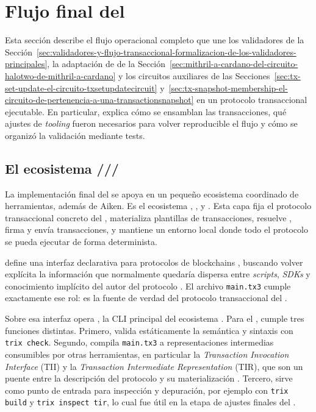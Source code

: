 
\section{Flujo final del \zkBridge}
\label{sec:final-bridge-flow-flujo-final-del-zkbridge}

Esta sección describe el flujo operacional completo que une los validadores de la Sección~\ref{sec:validadores-y-flujo-transaccional-formalizacion-de-los-validadores-principales}, la adaptación de \HaloTwo de la Sección~\ref{sec:mithril-a-cardano-del-circuito-halotwo-de-mithril-a-cardano} y los circuitos auxiliares de las Secciones~\ref{sec:tx-set-update-el-circuito-txsetupdatecircuit} y~\ref{sec:tx-snapshot-membership-el-circuito-de-pertenencia-a-una-transactionsnapshot} en un protocolo transaccional ejecutable. En particular, explica cómo se ensamblan las transacciones, qué ajustes de \textit{tooling} fueron necesarios para volver reproducible el flujo y cómo se organizó la validación mediante tests.

\subsection{El ecosistema \texorpdfstring{\TxThree/\Trix/\CShell/\Dolos}{Tx3/Trix/cshell/dolos}}
\label{subsec:final-bridge-flow-el-ecosistema-tx3-trix-cshell-dolos}

La implementación final del \zkBridge se apoya en un pequeño ecosistema coordinado de herramientas, además de Aiken. Es el ecosistema \TxThree, \Trix, \CShell y \Dolos. Esta capa fija el protocolo transaccional concreto del \zkBridge, materializa plantillas de transacciones, resuelve \UTxOs, firma y envía transacciones, y mantiene un entorno local donde todo el protocolo se pueda ejecutar de forma determinista.

\TxThree define una interfaz declarativa para protocolos de blockchains \UTxO, buscando volver explícita la información \Offchain que normalmente quedaría dispersa entre \textit{scripts}, \textit{SDKs} y conocimiento implícito del autor del protocolo \cite{Tx3DocsIntroduction}. El archivo \texttt{main.tx3} cumple exactamente ese rol: es la fuente de verdad del protocolo transaccional del \zkBridge.

Sobre esa interfaz opera \Trix, la CLI principal del ecosistema \TxThree \cite{Tx3DocsTrix}. Para el \zkBridge, \Trix cumple tres funciones distintas. Primero, valida estáticamente la semántica y sintaxis con \texttt{trix check}. Segundo, compila \texttt{main.tx3} a representaciones intermedias consumibles por otras herramientas, en particular la \textit{Transaction Invocation Interface} (TII) y la \textit{Transaction Intermediate Representation} (TIR), que son un puente entre la descripción del protocolo y su materialización \cite{Tx3DocsIntroduction,Tx3DocsTrix}. Tercero, sirve como punto de entrada para inspección y depuración, por ejemplo con \texttt{trix build} y \texttt{trix inspect tir}, lo cual fue útil en la etapa de ajustes finales del \zkBridge.

